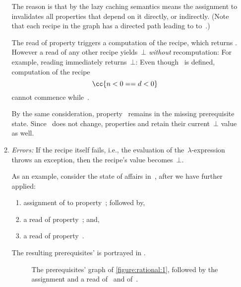 \begin{enumerate}
\begin{enumerate}
        The reason is that by the lazy caching semantics means the assignment to  
        invalidates all properties that depend on it directly, or indirectly.
        (Note that each recipe in the graph has a directed path leading to  
        to~.) 
         
        The  read of property  triggers a computation of
        the recipe, which returns .  However a read of any other
        recipe yields~$⊥$ \emph{without} recomputation: For example, reading
         immediately returns~$⊥$: Even though~ is defined,
        computation of the recipe \[
          \cc{n < 0 == d < 0} 
        \] cannot commence
        while~. 

        By the same consideration, property~ remains in the missing
        prerequisite state. Since~ does not change, properties 
        and  retain their current~$⊥$ value as well.

          \item\emph{Errors:} If the recipe itself fails, i.e., the \Java
          evaluation of the~$λ$-expression throws an exception, then the
          recipe's value becomes~$⊥$.

          As an example, consider the state of affairs in~,
          after we have further applied:

        \begin{enumerate}
          \item assignment of  to property~; followed by,  
          \item a read of property~; and, 
          \item a read of property~. 
        \end{enumerate}

        The resulting prerequisites' is portrayed in .

          \begin{figure}[H]
            \caption{\label{figure:rational:2}%
              The prerequisites' graph of \cref{figure:rational:1},
              followed by the assignment  and a read 
              of~ and of~.
            }
              \begin{adjustbox}{max width=\columnwidth}
              
              \end{adjustbox}
          \end{figure}


\end{enumerate}
\end{enumerate}
